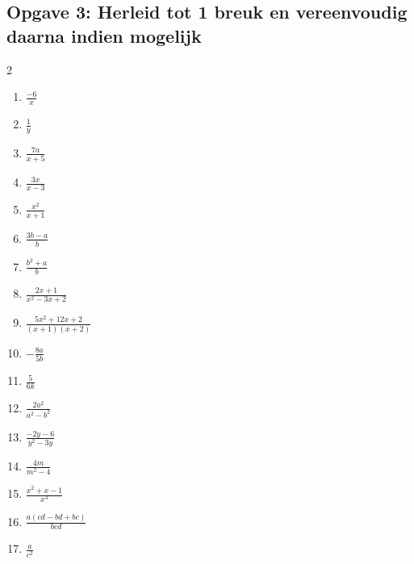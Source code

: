 \subsection*{Opgave 3: Herleid tot 1 breuk en vereenvoudig daarna indien mogelijk}
\begin{multicols}{2}
\begin{enumerate}[label=\alph*)]
    \item $\frac{-6}{x}$
    \item $\frac{1}{y}$
    \item $\frac{7a}{x+5}$
    \item $\frac{3x}{x-3}$
    \item $\frac{x^2}{x+1}$
    \item $\frac{3b-a}{b}$
    \item $\frac{b^2+a}{b}$
    \item $\frac{2x+1}{x^2-3x+2}$
    \item $\frac{5x^2+12x+2}{(x+1)(x+2)}$
    \item $-\frac{8a}{5b}$
    \item $\frac{5}{6k}$
    \item $\frac{2a^2}{a^2-b^2}$
    \item $\frac{-2y-6}{y^2-3y}$
    \item $\frac{4m}{m^2-4}$
    \item $\frac{x^2+x-1}{x^3}$
    \item $\frac{a(cd-bd+bc)}{bcd}$
    \item $\frac{a}{c^2}$
\end{enumerate}
\end{multicols}

